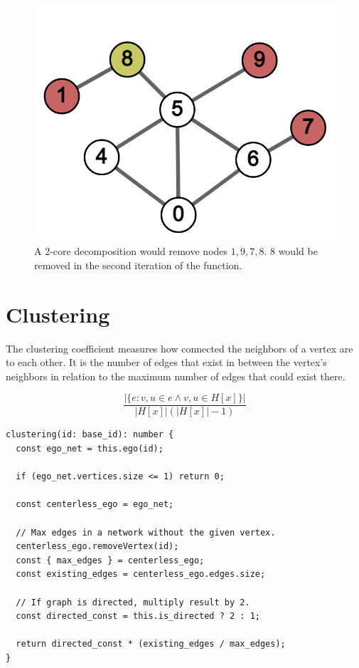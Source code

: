 \begin{figure}[H]
  \centering
  \includegraphics[scale=.25]{img/core_ex.png}
  \caption{A 2-core decomposition would remove nodes $1,9,7,8$. $8$ would be removed in the second iteration of the function.}
  \label{fig:core_ex}
\end{figure}


\section{Clustering}

The clustering coefficient measures how connected the neighbors of a vertex are to each other.
It is the number of edges that exist in between the vertex's neighbors in relation to the
maximum number of edges that could exist there.

$$\frac{|\{e:v,u\in e \wedge v,u\in H[x]\}|}{|H[x]|(|H[x]|-1)}$$

\begin{verbatim}
clustering(id: base_id): number {
  const ego_net = this.ego(id);

  if (ego_net.vertices.size <= 1) return 0;

  const centerless_ego = ego_net;

  // Max edges in a network without the given vertex.
  centerless_ego.removeVertex(id);
  const { max_edges } = centerless_ego;
  const existing_edges = centerless_ego.edges.size;

  // If graph is directed, multiply result by 2.
  const directed_const = this.is_directed ? 2 : 1;

  return directed_const * (existing_edges / max_edges);
}
\end{verbatim}

